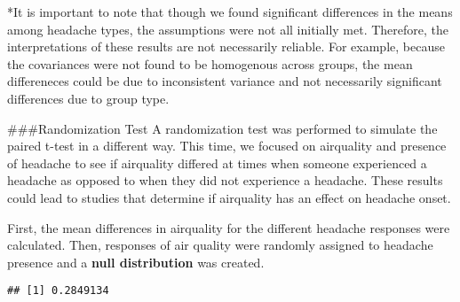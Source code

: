 \documentclass[]{article}
\newenvironment{Shaded}{\begin{snugshade}}{\end{snugshade}}
\newcommand{\KeywordTok}[1]{\textcolor[rgb]{0.13,0.29,0.53}{\textbf{#1}}}
\newcommand{\NormalTok}[1]{#1}
\newcommand{\OperatorTok}[1]{\textcolor[rgb]{0.81,0.36,0.00}{\textbf{#1}}}
\newcommand{\StringTok}[1]{\textcolor[rgb]{0.31,0.60,0.02}{#1}}
\begin{document}
*It is important to note that though we found significant differences in
the means among headache types, the assumptions were not all initially
met. Therefore, the interpretations of these results are not necessarily
reliable. For example, because the covariances were not found to be
homogenous across groups, the mean differeneces could be due to
inconsistent variance and not necessarily significant differences due to
group type.

\#\#\#Randomization Test A randomization test was performed to simulate
the paired t-test in a different way. This time, we focused on
airquality and presence of headache to see if airquality differed at
times when someone experienced a headache as opposed to when they did
not experience a headache. These results could lead to studies that
determine if airquality has an effect on headache onset.

First, the mean differences in airquality for the different headache
responses were calculated. Then, responses of air quality were randomly
assigned to headache presence and a \textbf{null distribution} was
created.

\begin{Shaded}
\end{Shaded}

\begin{verbatim}
## [1] 0.2849134
\end{verbatim}
\end{document}
